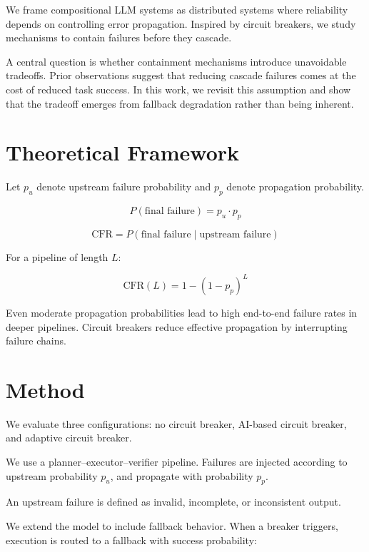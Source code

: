 \documentclass[11pt]{article}
\begin{document}
We frame compositional LLM systems as distributed systems where reliability depends on controlling error propagation. Inspired by circuit breakers, we study mechanisms to contain failures before they cascade.

A central question is whether containment mechanisms introduce unavoidable tradeoffs. Prior observations suggest that reducing cascade failures comes at the cost of reduced task success. In this work, we revisit this assumption and show that the tradeoff emerges from fallback degradation rather than being inherent.

\section{Theoretical Framework}

Let $p_u$ denote upstream failure probability and $p_p$ denote propagation probability.

\begin{equation}
P(\text{final failure}) = p_u \cdot p_p
\end{equation}

\begin{equation}
\text{CFR} = P(\text{final failure} \mid \text{upstream failure})
\end{equation}

For a pipeline of length $L$:

\begin{equation}
\text{CFR}(L) = 1 - (1 - p_p)^L
\end{equation}

Even moderate propagation probabilities lead to high end-to-end failure rates in deeper pipelines. Circuit breakers reduce effective propagation by interrupting failure chains.

\section{Method}

We evaluate three configurations: no circuit breaker, AI-based circuit breaker, and adaptive circuit breaker.

We use a planner–executor–verifier pipeline. Failures are injected according to upstream probability $p_u$, and propagate with probability $p_p$.

An upstream failure is defined as invalid, incomplete, or inconsistent output.

We extend the model to include fallback behavior. When a breaker triggers, execution is routed to a fallback with success probability:
\end{document}
